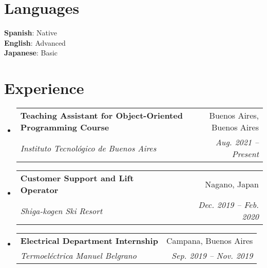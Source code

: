 \documentclass[letterpaper,11pt]{article}
\makeatletter
\newcommand{\resumeItem}[1]{
  \item\small{
    {#1 \vspace{-2pt}}
  }
}
\newcommand{\resumeSubheading}[4]{
  \vspace{-2pt}\item
    \begin{tabular*}{0.97\textwidth}[t]{l@{\extracolsep{\fill}}r}
      \textbf{#1} & #2 \\
      \textit{\small#3} & \textit{\small #4} \\
    \end{tabular*}\vspace{-7pt}
}
\newcommand{\resumeSubSubheading}[2]{
    \item
    \begin{tabular*}{0.97\textwidth}{l@{\extracolsep{\fill}}r}
      \textit{\small#1} & \textit{\small #2} \\
    \end{tabular*}\vspace{-7pt}
}
\newcommand{\resumeSubHeadingListStart}{\begin{itemize}[leftmargin=0.15in, label={}]}
\newcommand{\resumeSubHeadingListEnd}{\end{itemize}}
\newcommand{\resumeItemListStart}{\begin{itemize}}
\newcommand{\resumeItemListEnd}{\end{itemize}\vspace{-5pt}}
\makeatother
\begin{document}
\section{Languages}
 \begin{itemize}[leftmargin=0.15in, label={}]
    \small{\item{
     \textbf{Spanish}{: Native} \\
     \textbf{English}{: Advanced} \\
     \textbf{Japanese}{: Basic}
    }}
 \end{itemize}


\section{Experience}
  \resumeSubHeadingListStart
  \resumeSubheading
  {Teaching Assistant for Object-Oriented Programming Course}{Buenos Aires, Buenos Aires}
  {Instituto Tecnológico de Buenos Aires}{Aug. 2021 -- Present}
  \resumeSubheading
  {Customer Support and Lift Operator}{Nagano, Japan}
  {Shiga-kogen Ski Resort}{Dec. 2019 -- Feb. 2020}
    \resumeSubheading
    {Electrical Department Internship}{Campana, Buenos Aires}
      {Termoeléctrica Manuel Belgrano}{Sep. 2019 -- Nov. 2019}


   

  \resumeSubHeadingListEnd


\end{document}
